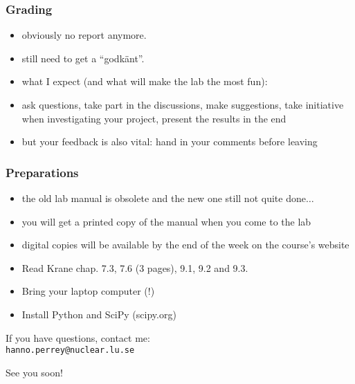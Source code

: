\documentclass[]{beamer} %
\begin{document}
\begin{frame}
  \frametitle{Grading}
  \begin{itemize}
  \item obviously no report anymore.
  \item still need to get a ``godkänt''.
  \item what I expect (and what will make the lab the most fun):\\
  \item ask questions, take part in the discussions, make suggestions,
    take initiative when investigating your project, present the
    results in the end
  \item but your feedback is also vital: hand in your comments before
    leaving
  \end{itemize}
\end{frame}

\begin{frame}
  \frametitle{Preparations}
  \begin{itemize}
  \item the old lab manual is obsolete and the new one still not quite
    done$\ldots$
  \item you will get a printed copy of the manual when you come to the
    lab
  \item digital copies will be available by the end of the week on the
    course's website
  \end{itemize}

\begin{itemize}
  \item Read Krane chap. 7.3, 7.6 (3 pages), 9.1, 9.2 and 9.3. 
  \item Bring your laptop computer (!)
  \item Install Python and SciPy (scipy.org)
  \end{itemize}
\vspace{.5cm}

\begin{flushright}
  If you have questions, contact me:\\
  \texttt{hanno.perrey@nuclear.lu.se}

  \vspace{.5cm} See you soon!
\end{flushright}
\end{frame}

\end{document}
